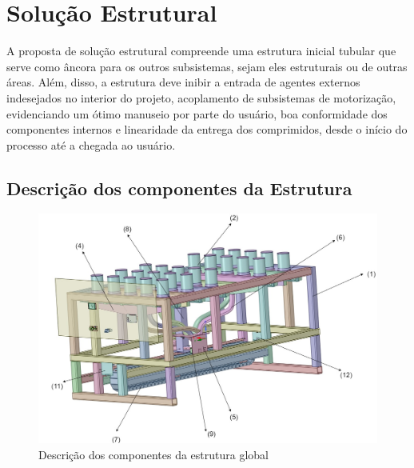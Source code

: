 \chapter[Solução Estrutural]{Solução Estrutural}

A proposta de solução estrutural compreende uma estrutura inicial tubular que serve como âncora para os outros subsistemas, sejam eles estruturais ou de outras áreas. Além, disso, a estrutura deve inibir a entrada de agentes externos indesejados no interior do projeto, acoplamento de subsistemas de motorização, evidenciando um ótimo manuseio por parte do usuário, boa conformidade dos componentes internos e linearidade da entrega dos comprimidos, desde o início do processo até a chegada ao usuário.


\section{Descrição dos componentes da Estrutura}

\begin{figure}[ht]
        \centering
        \includegraphics[width=1\textwidth]{figuras/estrutura/Design/descricao_estrutura.jpg}
        \caption{Descrição dos componentes da estrutura global}
        \label{fig:Descrição_Global}
    \end{figure}

